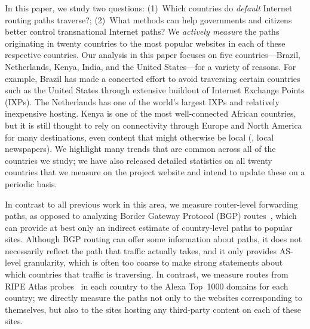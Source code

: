 In this paper, we study two questions: (1)~Which countries do {\em   default}
Internet routing paths traverse?; (2)~What methods can  help governments and
citizens better control transnational Internet paths?  We {\em actively
measure} the paths originating in twenty countries to the most popular
websites in each of these respective countries.
Our analysis in this paper focuses on five countries---Brazil, Netherlands,
Kenya, India, and the United States---for a variety of reasons.  For example,
Brazil has made a concerted effort to avoid traversing certain countries such
as the United States through extensive buildout of Internet Exchange Points
(IXPs). The Netherlands has one of the world's largest IXPs and relatively
inexpensive hosting. Kenya is one of the most well-connected African
countries, but it is still thought to rely on connectivity through Europe and
North America for many destinations, even content that might otherwise be
local (\eg, local newspapers). We highlight many trends that are common across all
of the countries we study; we have also released detailed statistics on all twenty
countries that we measure on the project website and intend to update these on a
periodic basis.

In contrast to all previous work in this area, we measure router-level
forwarding paths, as opposed to analyzing Border Gateway Protocol (BGP)
routes~\cite{karlin2009nation,shah2015characterizing}, which can provide at
best only an indirect estimate of country-level paths to popular sites.
Although BGP routing can offer some information about paths, it does not
necessarily reflect the path that traffic actually takes, and it only provides
AS-level granularity, which is often too coarse to make strong statements
about which countries that traffic is traversing.  In contrast, we measure
routes from RIPE Atlas probes~\cite{ripe_atlas} in each country to the Alexa
Top~1000 domains for each country; we directly measure the paths not only to
the websites corresponding to themselves, but also to the sites hosting any
third-party content on each of these sites.


